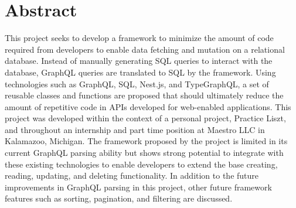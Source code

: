 \section*{Abstract}
This project seeks to develop a framework to minimize the amount of code required from developers to enable data fetching and mutation on a relational database.  Instead of manually generating SQL queries to interact with the database, GraphQL queries are translated to SQL by the framework.  Using technologies such as GraphQL, SQL, Nest.js, and TypeGraphQL, a set of reusable classes and functions are proposed that should ultimately reduce the amount of repetitive code in APIs developed for web-enabled applications. This project was developed within the context of a personal project, Practice Liszt, and throughout an internship and part time position at Maestro LLC in Kalamazoo, Michigan.  The framework proposed by the project is limited in its current GraphQL parsing ability but shows strong potential to integrate with these existing technologies to enable developers to extend the base creating, reading, updating, and deleting functionality.  In addition to the future improvements in GraphQL parsing in this project, other future framework features such as sorting, pagination, and filtering are discussed.